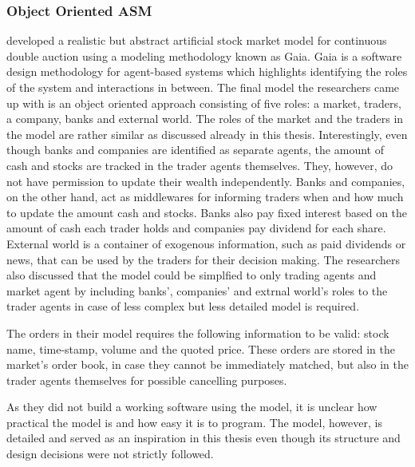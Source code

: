 \subsubsection{Object Oriented ASM}
\citet{Ben12} developed a realistic but abstract artificial stock market
model for continuous double auction using a modeling methodology known as 
Gaia. Gaia is a software design methodology for agent-based systems which 
highlights identifying the roles of the system and interactions in between.
The final model the researchers came up with is an object oriented 
approach consisting of five roles: a market, traders, a company, banks
and external world. The roles of the market and the traders in the model 
are rather similar as discussed already in this thesis. Interestingly,
even though banks and companies are identified as separate agents, 
the amount of cash and stocks are tracked in the trader agents themselves.
They, however, do not have permission to update their wealth independently. 
Banks and companies, on the other hand, act as middlewares for informing 
traders when and how much to update the amount cash and stocks. Banks also pay 
fixed interest based on the amount of cash each trader holds and companies 
pay dividend for each share. External world is a container of exogenous 
information, such as paid dividends or news, that can be used by the traders for 
their decision making. The researchers also discussed that the model could be
simplfied to only trading agents and market agent by including banks', companies' 
and extrnal world's roles to the trader agents in case of less complex but 
less detailed model is required.

The orders in their model requires the following information to be valid:
stock name, time-stamp, volume and the quoted price. These orders are stored
in the market's order book, in case they cannot be immediately matched, but 
also in the trader agents themselves for possible cancelling purposes.


As they did not build a working software using the model, it is unclear
how practical the model is and how easy it is to program. The model, 
however, is detailed and served as an inspiration in this thesis even though
its structure and design decisions were not strictly followed.


